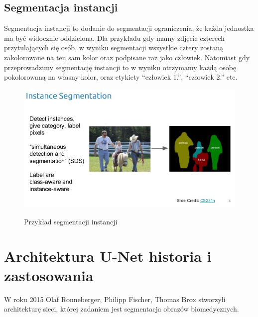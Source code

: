 \documentclass{article}
\begin{document}
\subsection{Segmentacja instancji}
Segmentacja instancji to dodanie do segmentacji ograniczenia, że każda jednostka ma być widocznie oddzielona.
Dla przykładu gdy mamy zdjęcie czterech przytulających się osób, w wyniku segmentacji wszystkie cztery zostaną zakolorowane na ten sam kolor oraz podpisane raz jako człowiek.
Natomiast gdy przeprowadzimy segmentację instancji to w wyniku otrzymamy każdą osobę pokolorowaną na własny kolor, oraz etykiety ``człowiek 1.'', ``człowiek 2.'' etc.
\begin{figure}[H]
    \centering
    \includegraphics[width=\linewidth]{images/segmentacja_instancji.jpeg}
    \caption{Przykład segmentacji instancji}
    \cite{unet}
    \label{fig:segmentacja_instancji}
\end{figure}
\newpage
\section{Architektura U-Net historia i zastosowania}
W roku 2015 Olaf Ronneberger, Philipp Fischer, Thomas Brox stworzyli architekturę sieci, której zadaniem jest segmentacja obrazów biomedycznych\cite{unetpaper}.
\end{document}
